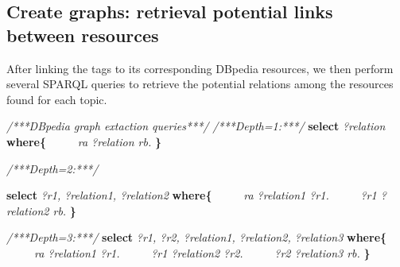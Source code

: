 \subsection{Create graphs: retrieval potential links between resources}
After linking the tags to its corresponding DBpedia resources, we then perform several SPARQL queries to retrieve the potential relations among the resources found for each topic. 

\begin{algorithm}%
\begin{algorithmic}[1]
\label{algo:dbpediaquery}
\State \textit{/***DBpedia graph extaction queries***/}
\State \textit{/***Depth=1:***/}
\State \textbf{select} \textit{?relation}
\State \textbf{where\{}
\State \ \ \ \ \ \textit{ra ?relation rb.}
\State \textbf{\}}


\State \textit{/***Depth=2:***/}

\State \textbf{select}  \textit{?r1, ?relation1, ?relation2} 
\State \textbf{where\{} 
\State \ \ \ \ \ \textit{ra ?relation1 ?r1.}
\State \ \ \ \ \ \textit{?r1 ?relation2 rb.} 
\State \textbf{\}} 


\State \textit{/***Depth=3:***/}
\State \textbf{select}  \textit{?r1, ?r2, ?relation1, ?relation2, ?relation3} 
\State \textbf{where\{} 
\State \ \ \ \ \ \textit{ra ?relation1 ?r1.}
\State \ \ \ \ \ \textit{?r1 ?relation2 ?r2.}
\State \ \ \ \ \ \textit{?r2 ?relation3 rb.} 
\State \textbf{\}} 


\end{algorithmic}
\end{algorithm}









